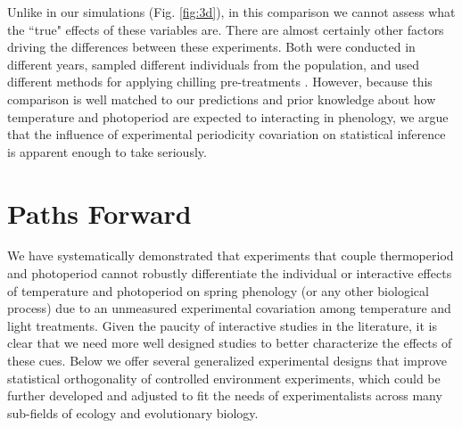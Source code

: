 \documentclass[11pt]{article}
\begin{document}
Unlike in our simulations (Fig. \ref{fig:3d}), in this comparison we cannot assess what the ``true" effects of these variables are. There are almost certainly other factors driving the differences between these experiments. Both were conducted in different years, sampled different individuals from the population, and used different methods for applying chilling pre-treatments \citep{Flynn2018,Buonaiuto:2021ug}. However, because this comparison is well matched to our predictions and prior knowledge about how temperature and photoperiod are expected to interacting in phenology, we argue that the influence of experimental periodicity covariation on statistical inference is apparent enough to take seriously.\\

\section*{Paths Forward}
We have systematically demonstrated that experiments that couple thermoperiod and photoperiod cannot robustly differentiate the individual or interactive effects of temperature and photoperiod on spring phenology (or any other biological process) due to an unmeasured experimental covariation among temperature and light treatments. Given the paucity of interactive studies in the literature, it is clear that we need more well designed studies to better characterize the effects of these cues. Below we offer several generalized experimental designs that improve statistical orthogonality of controlled environment experiments, which could be further developed and adjusted to fit the needs of experimentalists across many sub-fields of ecology and evolutionary biology.
\end{document}
